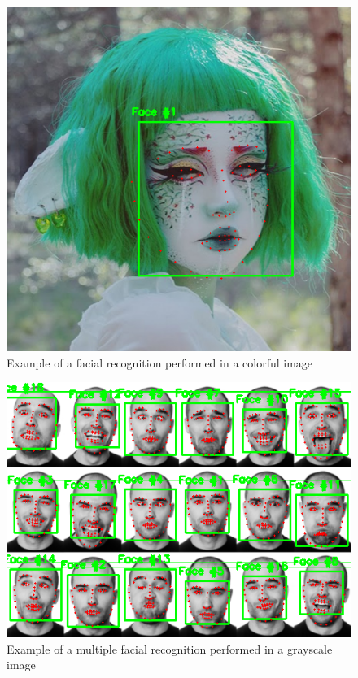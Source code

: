 \documentclass[12pt,a4paper]{article}
\begin{document}
    \begin{figure}[!hb]
        \centering
        \includegraphics[scale=0.5]{anzusc.png}
        \caption{Example of a facial recognition performed in a colorful image}
        \label{Anzu}
    \end{figure}

    \begin{figure}[!hb]
        \centering
        \includegraphics[scale=0.5]{multiple-faces.png}
        \caption{Example of a multiple facial recognition performed in a grayscale image}
        \label{Gray}
    \end{figure}
    
\end{document}
